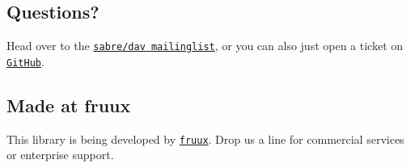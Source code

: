 \subsection*{Questions? }

Head over to the \href{http://groups.google.com/group/sabredav-discuss}{\tt sabre/dav mailinglist}, or you can also just open a ticket on \href{https://github.com/fruux/sabre-uri/issues/}{\tt Git\+Hub}.

\subsection*{Made at fruux }

This library is being developed by \href{https://fruux.com/}{\tt fruux}. Drop us a line for commercial services or enterprise support. 